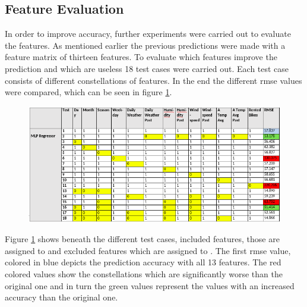 \subsection{Feature Evaluation}\label{sec:featureeval}
In order to improve accuracy, further experiments were carried out to evaluate the features. As mentioned earlier the previous predictions were made with a feature matrix of thirteen features. To evaluate which features improve the prediction and which are useless 18 test cases were carried out. Each test case consists of different constellations of features. In the end the different \acs{rmse} values were compared, which can be seen in figure \ref{fig:evalmlp}.
\begin{figure}[H]
\hspace{-1.5cm}
\includegraphics[width=1.2\textwidth]{img/evalmlp}\label{fig:evalmlp}
\label{fig:evalmlp}
\end{figure}
Figure \ref{fig:evalmlp} shows beneath the different test cases, included features, those are assigned to \grqq
 and excluded features which are assigned to \grqq. The first \acs{rmse} value, colored in blue depicts the prediction accuracy with all 13 features. The red colored values show the constellations which are significantly worse than the original one and in turn the green values represent the values with an increased accuracy than the original one.

